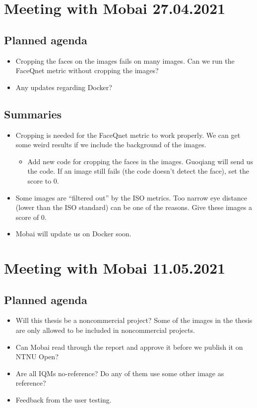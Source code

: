 \section*{Meeting with Mobai 27.04.2021}
\subsection*{Planned agenda}
\begin{itemize}
    \item Cropping the faces on the images fails on many images. Can we run the FaceQnet metric without cropping the images?
    \item Any updates regarding Docker?
\end{itemize}

\subsection*{Summaries}
\begin{itemize}
    \item Cropping is needed for the FaceQnet metric to work properly. We can get some weird results if we include the background of the images.
    \begin{itemize}
    \item Add new code for cropping the faces in the images. Guoqiang will send us the code. If an image still fails (the code doesn’t detect the face), set the score to 0.
    \end{itemize}
    \item Some images are “filtered out” by the ISO metrics. Too narrow eye distance (lower than the ISO standard) can be one of the reasons. Give these images a score of 0.
    \item Mobai will update us on Docker soon.
\end{itemize}


\section*{Meeting with Mobai 11.05.2021}
\subsection*{Planned agenda}
\begin{itemize}
    \item Will this thesis be a noncommercial project? Some of the images in the thesis are only allowed to be included in noncommercial projects.
    \item Can Mobai read through the report and approve it before we publish it on NTNU Open?
    \item Are all IQMs no-reference? Do any of them use some other image as reference?
    \item Feedback from the user testing.
\end{itemize}

